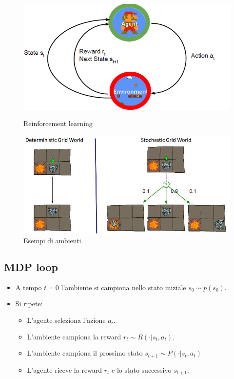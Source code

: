 	\begin{figure}
		\centering
		\begin{minipage}{.5\textwidth}
			\centering
			\includegraphics[width=0.7\linewidth]{imgs/chapter13/img0}
			\caption{Reinforcement learning}
			\label{fig:chapter13-00}
		\end{minipage}%
		\begin{minipage}{.5\textwidth}
			\centering
			\includegraphics[width=1\linewidth]{imgs/chapter13/img1}
			\caption{Esempi di ambienti}
			\label{fig:chapter13-01}
		\end{minipage}
	\end{figure}
	
	\subsection{MDP loop}
	\begin{itemize}
		\item A tempo $t=0$ l'ambiente si campiona nello stato iniziale $s_0\sim p(s_0)$.
		\item Si ripete:
		\begin{itemize}
			\item L'agente seleziona l'azione $a_i$.
			\item L'ambiente campiona la reward $r_t\sim R(\cdot|s_t, a_t)$.
			\item L'ambiente campiona il prossimo stato $s_{t+1}\sim P(\cdot|s_t, a_t)$
			\item L'agente riceve la reward $r_t$ e lo stato successivo $s_{t+1}$.
		\end{itemize}
	\end{itemize}
	
